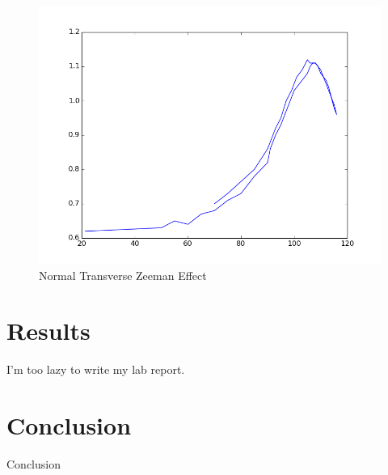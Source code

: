 \documentclass[a4paper]{article}
\begin{document}
\begin{center} 
\begin{figure}[H] 
\begin{center}
\includegraphics[scale = 0.5]{graphs/03table1.png}
\caption{Normal Transverse Zeeman Effect} 
\end{center}
\end{figure}
\end{center}


\section*{Results}

I'm too lazy to write my lab report.

\section*{Conclusion}

Conclusion
\end{document}
